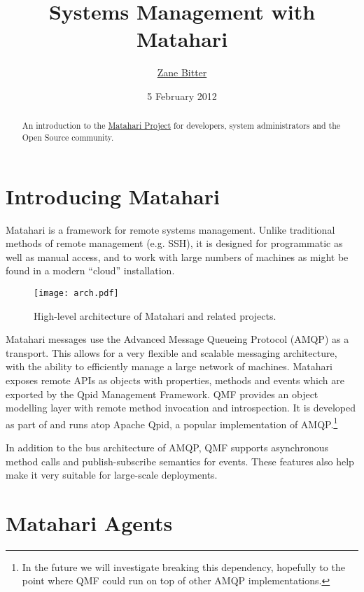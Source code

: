 \documentclass{tufte-handout}
\title{Systems Management with Matahari}
\author{\href{mailto:zbitter@redhat.com}{Zane Bitter}}
\date{5 February 2012}
\begin{document}
\maketitle

\marginnote{\tableofcontents \vspace{2em}}

\begin{abstract}
An introduction to the \href{http://matahariproject.org}{Matahari Project} for developers, system administrators and the Open Source community.
\end{abstract}

\section{Introducing Matahari}

Matahari is a framework for remote systems management. Unlike traditional methods of remote management (e.g. SSH), it is designed for programmatic as well as manual access, and to work with large numbers of machines as might be found in a modern ``cloud'' installation.

\begin{figure*}[b!]
\texttt{[image: arch.pdf]}
\caption{High-level architecture of Matahari and related projects.}
\label{fig:arch}
\end{figure*}

Matahari messages use the Advanced Message Queueing Protocol (AMQP) as a transport. This allows for a very flexible and scalable messaging architecture, with the ability to efficiently manage a large network of machines.
Matahari exposes remote APIs as objects with properties, methods and events which are exported by the Qpid Management Framework. QMF provides an object modelling layer with remote method invocation and introspection. It is developed as part of and runs atop Apache Qpid, a popular implementation of AMQP.\footnote{In the future we will investigate breaking this dependency, hopefully to the point where QMF could run on top of other AMQP implementations.}

In addition to the bus architecture of AMQP, QMF supports asynchronous method calls and publish-subscribe semantics for events. These features also help make it very suitable for large-scale deployments.

\section{Matahari Agents}
\end{document}
